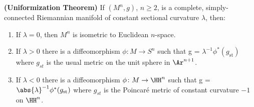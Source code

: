 \begin{theorem}
\label{thm:uniformization}
{\bf (Uniformization Theorem)} If
$(M^n,g)$, $n\ge2$, is a complete, simply-connected Riemannian
manifold of constant sectional curvature $\lambda$, then:
\begin{enumerate}
\item If $\lambda=0$, then $M^n$ is isometric to Euclidean $n$-space.
\item If $\lambda>0$ there is a diffeomorphism $\phi \colon M \rightarrow S^{n}$
 such that g = $\lambda^{-1}\phi^{*}(g_\mathrm{st})$ where $g_{st}$ is the usual metric on the unit sphere in $\Ar^{n+1}$.
\item If $\lambda<0$ there is a diffeomorphism $\phi \colon M \rightarrow \HH^{n}$
 such that g = $\abs{\lambda}^{-1}\phi^{*}(g_\mathrm{st})$ where $g_{st}$ is the Poincar\'e metric of constant curvature
$-1$ on $\HH^n$.
\end{enumerate}
\end{theorem}

